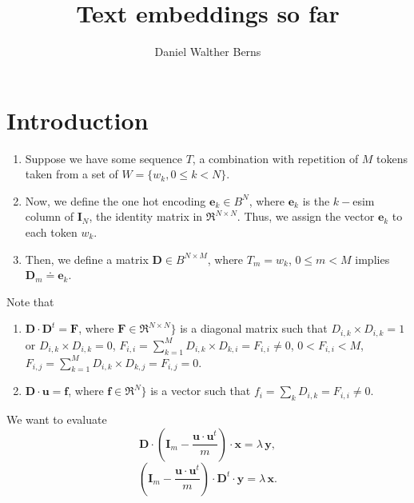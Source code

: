 \documentclass[10pt,a4paper]{article}
\author{Daniel Walther Berns}
\title{Text embeddings so far}
\newcommand\m[1]{\mathbf#1}
\begin{document}
	\section{Introduction}
	\begin{enumerate}
	\item Suppose we have some sequence $T$, a combination with repetition of $M$ tokens taken from a set of $W = \{w_{k}, 0 \leq k < N\}$.
    \item Now, we define the one hot encoding $\m{e}_{k} \in B^{N}$, 
    where $\m{e}_{k}$ is the $k-$esim column of $\m{I}_{N}$, the identity matrix in $\Re^{N \times N}$. Thus, we assign the vector $\m{e}_{k}$ to each token $w_{k}$.
    \item Then, we define a matrix $\m{D} \in B^{N \times M}$, where $T_{m} = w_{k}$, $0 \leq m < M$ implies
    $\m{D}_{m} \doteq \m{e}_{k}$.
    \end{enumerate}

Note that
\begin{enumerate}
	\item $\m{D} \cdot \m{D}^{t} = \m{F}$, where $\m{F} \in \Re^{N \times N}\}$ is a diagonal matrix such that 
	$D_{i,k} \times D_{i,k} = 1$ or $D_{i,k} \times D_{i,k} = 0$,
	$F_{i,i} = \sum_{k=1}^{M} D_{i,k} \times D_{k,i} = F_{i,i} \neq 0$, $0 < F_{i,i} < M$, 
	$F_{i,j} = \sum_{k=1}^{M} D_{i,k} \times D_{k,j} = F_{i,j} = 0$.
	\item $\m{D} \cdot \m{u} = \m{f}$, where $\m{f} \in \Re^{N}\}$ is a vector such that
	$f_{i} = \sum_{k} D_{i,k} = F_{i,i} \neq 0$.  	
\end{enumerate}
    
    We want to evaluate
    \begin{equation}
    	\m{D} \cdot \left(\m{I}_{m} - \frac{\m{u} \cdot \m{u}^{t}}{m}\right) \cdot \m{x} = \lambda \, \m{y},
    \end{equation}
    \begin{equation}
	\left(\m{I}_{m} - \frac{\m{u} \cdot \m{u}^{t}}{m}\right) \cdot \m{D}^{t} \cdot \m{y} = \lambda \, \m{x}.
\end{equation}
\end{document}

